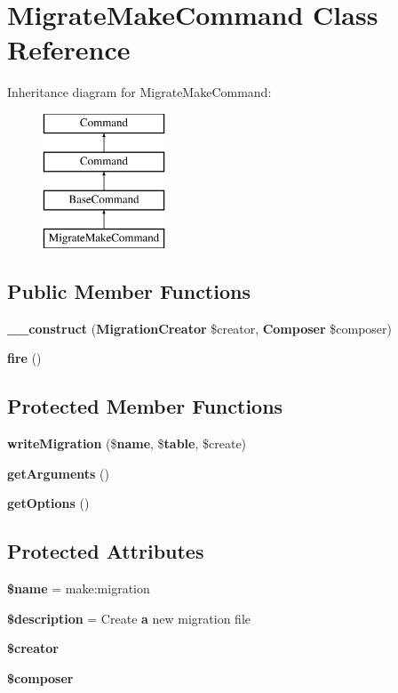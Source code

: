 \section{Migrate\+Make\+Command Class Reference}
\label{class_illuminate_1_1_database_1_1_console_1_1_migrations_1_1_migrate_make_command}
Inheritance diagram for Migrate\+Make\+Command\+:\begin{figure}[H]
\begin{center}
\leavevmode
\includegraphics[height=4.000000cm]{class_illuminate_1_1_database_1_1_console_1_1_migrations_1_1_migrate_make_command}
\end{center}
\end{figure}
\subsection*{Public Member Functions}
\begin{DoxyCompactItemize}
\item 
{\bf \+\_\+\+\_\+construct} ({\bf Migration\+Creator} \$creator, {\bf Composer} \$composer)
\item 
{\bf fire} ()
\end{DoxyCompactItemize}
\subsection*{Protected Member Functions}
\begin{DoxyCompactItemize}
\item 
{\bf write\+Migration} (\${\bf name}, \${\bf table}, \$create)
\item 
{\bf get\+Arguments} ()
\item 
{\bf get\+Options} ()
\end{DoxyCompactItemize}
\subsection*{Protected Attributes}
\begin{DoxyCompactItemize}
\item 
{\bf \$name} = \textquotesingle{}make\+:migration\textquotesingle{}
\item 
{\bf \$description} = \textquotesingle{}Create {\bf a} new migration file\textquotesingle{}
\item 
{\bf \$creator}
\item 
{\bf \$composer}
\end{DoxyCompactItemize}


